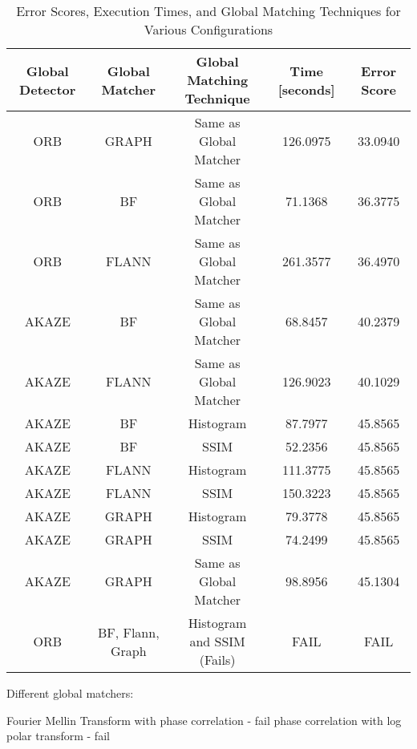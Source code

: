 \begin{table}[H]
    \centering
    \small  %
    \setlength{\tabcolsep}{4pt}  %
    \renewcommand{\arraystretch}{1.2}  %
    \begin{tabular}{|c|c|c|c|c|}
    \hline
    \textbf{Global Detector} & \textbf{Global Matcher} & \makecell{\textbf{Global Matching} \\ \textbf{Technique}} & \textbf{Time [seconds]} & \textbf{Error Score} \\ \hline
    ORB & GRAPH & Same as Global Matcher & 126.0975 & 33.0940 \\ \hline
    ORB & BF & \makecell{Same as \\ Global Matcher} & 71.1368 & 36.3775 \\ \hline
    ORB & FLANN & \makecell{Same as \\ Global Matcher} & 261.3577 & 36.4970 \\ \hline
    AKAZE & BF & \makecell{Same as \\ Global Matcher} & 68.8457 & 40.2379 \\ \hline
    AKAZE & FLANN & \makecell{Same as \\ Global Matcher} & 126.9023 & 40.1029 \\ \hline
    AKAZE & BF & Histogram & 87.7977 & 45.8565 \\ \hline
    AKAZE & BF & SSIM & 52.2356 & 45.8565 \\ \hline
    AKAZE & FLANN & Histogram & 111.3775 & 45.8565 \\ \hline
    AKAZE & FLANN & SSIM & 150.3223 & 45.8565 \\ \hline
    AKAZE & GRAPH & Histogram & 79.3778 & 45.8565 \\ \hline
    AKAZE & GRAPH & SSIM & 74.2499 & 45.8565 \\ \hline
    AKAZE & GRAPH & \makecell{Same as \\ Global Matcher} & 98.8956 & 45.1304 \\ \hline
    ORB & BF, Flann, Graph & \makecell{Histogram \\ and SSIM (Fails)} & FAIL & FAIL \\ \hline
    \end{tabular}
    \caption{Error Scores, Execution Times, and Global Matching Techniques for Various Configurations}
\end{table}




Different global matchers:

Fourier Mellin Transform with phase correlation - fail
phase correlation with log polar transform - fail